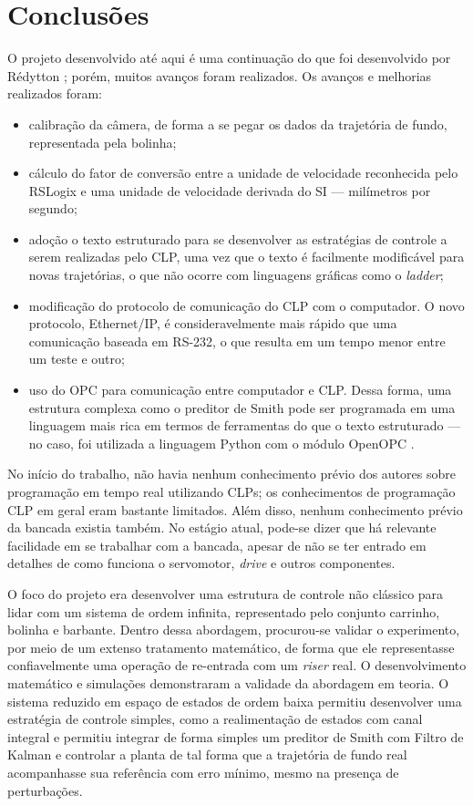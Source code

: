 
\chapter{Conclusões}

\label{CapConclusoes}

O projeto desenvolvido até aqui é uma continuação do que foi desenvolvido por Rédytton \cite{redytton}; porém, muitos avanços foram realizados. Os avanços e melhorias realizados foram:
\begin{itemize}
\item calibração da câmera, de forma a se pegar os dados da trajetória de fundo, representada pela bolinha;
\item cálculo do fator de conversão entre a unidade de velocidade reconhecida pelo RSLogix e uma unidade de velocidade derivada do SI --- milímetros por segundo;
\item adoção o texto estruturado para se desenvolver as estratégias de controle a serem realizadas pelo CLP, uma vez que o texto é facilmente modificável para novas trajetórias, o que não ocorre com linguagens gráficas como o \textit{ladder};
\item modificação do protocolo de comunicação do CLP com o computador. O novo protocolo, Ethernet/IP, é consideravelmente mais rápido que uma comunicação baseada em RS-232, o que resulta em um tempo menor entre um teste e outro;
\item uso do OPC para comunicação entre computador e CLP. Dessa forma, uma estrutura complexa como o preditor de Smith pode ser programada em uma linguagem mais rica em termos de ferramentas do que o texto estruturado --- no caso, foi utilizada a linguagem Python com o módulo OpenOPC \cite{OpenOPC}.
\end{itemize}

No início do trabalho, não havia nenhum conhecimento prévio dos autores sobre programação em tempo real utilizando CLPs; os conhecimentos de programação CLP em geral eram bastante limitados. Além disso, nenhum conhecimento prévio da bancada existia também. No estágio atual, pode-se dizer que há relevante facilidade em se trabalhar com a bancada, apesar de não se ter entrado em detalhes de como funciona o servomotor, \textit{drive} e outros componentes.

O foco do projeto era desenvolver uma estrutura de controle não clássico para lidar com um sistema de ordem infinita, representado pelo conjunto carrinho, bolinha e barbante. Dentro dessa abordagem, procurou-se validar o experimento, por meio de um extenso tratamento matemático, de forma que ele representasse confiavelmente uma operação de re-entrada com um \textit{riser} real. O desenvolvimento matemático e simulações demonstraram a validade da abordagem em teoria. O sistema reduzido em espaço de estados de ordem baixa permitiu desenvolver uma estratégia de controle simples, como a realimentação de estados com canal integral e permitiu integrar de forma simples um preditor de Smith com Filtro de Kalman e controlar a planta de tal forma que a trajetória de fundo real acompanhasse sua referência com erro mínimo, mesmo na presença de perturbações.


